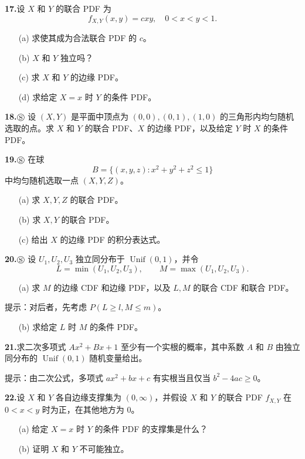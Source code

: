 \documentclass[UTF8, 12pt, fontset=fandol, oneside]{ctexart}
\begin{document}
\noindent\textbf{17.}\quad 设 $X$ 和 $Y$ 的联合 PDF 为
\[
  f_{X,Y}(x,y)=cxy,\quad 0<x<y<1.
\]
\begin{enumerate}
  \item[(a)] 求使其成为合法联合 PDF 的 $c$。
  \item[(b)] $X$ 和 $Y$ 独立吗？
  \item[(c)] 求 $X$ 和 $Y$ 的边缘 PDF。
  \item[(d)] 求给定 $X=x$ 时 $Y$ 的条件 PDF。
\end{enumerate}

\noindent\textbf{18.}\quad $\circledS$ 设 $(X,Y)$ 是平面中顶点为 $(0,0),(0,1),(1,0)$ 的三角形内均匀随机选取的点。求 $X$ 和 $Y$ 的联合 PDF、$X$ 的边缘 PDF，以及给定 $Y$ 时 $X$ 的条件 PDF。

\noindent\textbf{19.}\quad $\circledS$ 在球
\[
  B=\{(x,y,z):x^2+y^2+z^2\le 1\}
\]
中均匀随机选取一点 $(X,Y,Z)$。
\begin{enumerate}
  \item[(a)] 求 $X,Y,Z$ 的联合 PDF。
  \item[(b)] 求 $X,Y$ 的联合 PDF。
  \item[(c)] 给出 $X$ 的边缘 PDF 的积分表达式。
\end{enumerate}

\noindent\textbf{20.}\quad $\circledS$ 设 $U_1,U_2,U_3$ 独立同分布于 $\operatorname{Unif}(0,1)$，并令
\[
  L=\min(U_1,U_2,U_3),\qquad M=\max(U_1,U_2,U_3).
\]
\begin{enumerate}
  \item[(a)] 求 $M$ 的边缘 CDF 和边缘 PDF，以及 $L,M$ 的联合 CDF 和联合 PDF。
\end{enumerate}
提示：对后者，先考虑 $P(L\ge l,M\le m)$。
\begin{enumerate}
  \item[(b)] 求给定 $L$ 时 $M$ 的条件 PDF。
\end{enumerate}

\noindent\textbf{21.}\quad 求二次多项式 $Ax^2+Bx+1$ 至少有一个实根的概率，其中系数 $A$ 和 $B$ 由独立同分布的 $\operatorname{Unif}(0,1)$ 随机变量给出。

提示：由二次公式，多项式 $ax^2+bx+c$ 有实根当且仅当 $b^2-4ac\ge 0$。

\noindent\textbf{22.}\quad 设 $X$ 和 $Y$ 各自边缘支撑集为 $(0,\infty)$，并假设 $X$ 和 $Y$ 的联合 PDF $f_{X,Y}$ 在 $0<x<y$ 时为正，在其他地方为 $0$。
\begin{enumerate}
  \item[(a)] 给定 $X=x$ 时 $Y$ 的条件 PDF 的支撑集是什么？
  \item[(b)] 证明 $X$ 和 $Y$ 不可能独立。
\end{enumerate}
\end{document}
